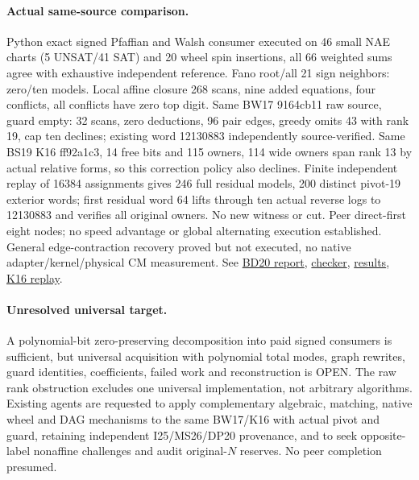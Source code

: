 \documentclass[11pt]{article}
\begin{document}
\paragraph{Actual same-source comparison.} Python exact signed Pfaffian and Walsh consumer executed on 46 small NAE charts (5 UNSAT/41 SAT) and 20 wheel spin insertions, all 66 weighted sums agree with exhaustive independent reference. Fano root/all 21 sign neighbors: zero/ten models. Local affine closure 268 scans, nine added equations, four conflicts, all conflicts have zero top digit. Same BW17 9164cb11 raw source, guard empty: 32 scans, zero deductions, 96 pair edges, greedy omits 43 with rank 19, cap ten declines; existing word 12130883 independently source-verified. Same BS19 K16 ff92a1c3, 14 free bits and 115 owners, 114 wide owners span rank 13 by actual relative forms, so this correction policy also declines. Finite independent replay of 16384 assignments gives 246 full residual models, 200 distinct pivot-19 exterior words; first residual word 64 lifts through ten actual reverse logs to 12130883 and verifies all original owners. No new witness or cut. Peer direct-first eight nodes; no speed advantage or global alternating execution established. General edge-contraction recovery proved but not executed, no native adapter/kernel/physical CM measurement. See \href{https://github.com/j15marti/pnp/commit/65b59a9b4ca482fd877d136de71a7ecf15144ffd}{BD20 report}, \href{https://github.com/j15marti/pnp/commit/646bc6a02ccafabeaa60104587ba83d2bdeb7887}{checker}, \href{https://github.com/j15marti/pnp/commit/bf63994d726511b5191c8f08a54c75ff046679fc}{results}, \href{https://github.com/j15marti/pnp/commit/c10c79fe26d3282386b7b08a7ce7b676688abfc9}{K16 replay}.
\paragraph{Unresolved universal target.} A polynomial-bit zero-preserving decomposition into paid signed consumers is sufficient, but universal acquisition with polynomial total modes, graph rewrites, guard identities, coefficients, failed work and reconstruction is OPEN. The raw rank obstruction excludes one universal implementation, not arbitrary algorithms. Existing agents are requested to apply complementary algebraic, matching, native wheel and DAG mechanisms to the same BW17/K16 with actual pivot and guard, retaining independent I25/MS26/DP20 provenance, and to seek opposite-label nonaffine challenges and audit original-$N$ reserves. No peer completion presumed.
\end{document}
